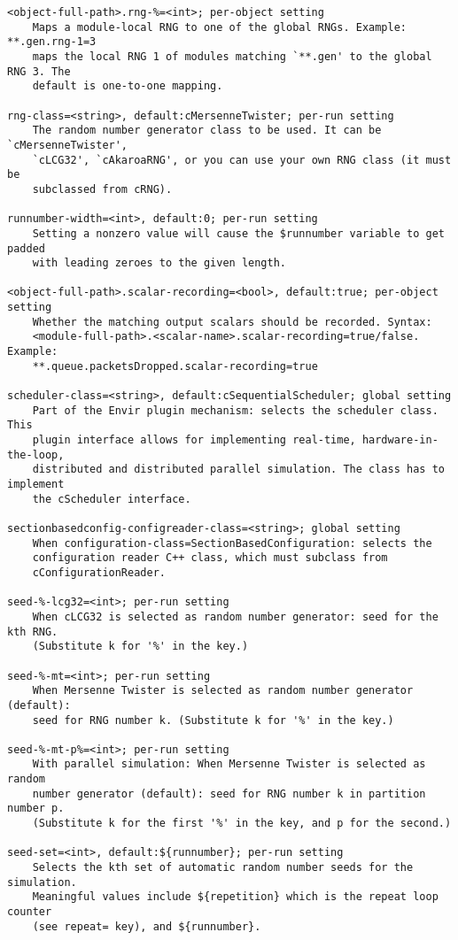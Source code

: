 \begin{verbatim}
<object-full-path>.rng-%=<int>; per-object setting
    Maps a module-local RNG to one of the global RNGs. Example: **.gen.rng-1=3
    maps the local RNG 1 of modules matching `**.gen' to the global RNG 3. The
    default is one-to-one mapping.

rng-class=<string>, default:cMersenneTwister; per-run setting
    The random number generator class to be used. It can be `cMersenneTwister',
    `cLCG32', `cAkaroaRNG', or you can use your own RNG class (it must be
    subclassed from cRNG).

runnumber-width=<int>, default:0; per-run setting
    Setting a nonzero value will cause the $runnumber variable to get padded
    with leading zeroes to the given length.

<object-full-path>.scalar-recording=<bool>, default:true; per-object setting
    Whether the matching output scalars should be recorded. Syntax:
    <module-full-path>.<scalar-name>.scalar-recording=true/false. Example:
    **.queue.packetsDropped.scalar-recording=true

scheduler-class=<string>, default:cSequentialScheduler; global setting
    Part of the Envir plugin mechanism: selects the scheduler class. This
    plugin interface allows for implementing real-time, hardware-in-the-loop,
    distributed and distributed parallel simulation. The class has to implement
    the cScheduler interface.

sectionbasedconfig-configreader-class=<string>; global setting
    When configuration-class=SectionBasedConfiguration: selects the
    configuration reader C++ class, which must subclass from
    cConfigurationReader.

seed-%-lcg32=<int>; per-run setting
    When cLCG32 is selected as random number generator: seed for the kth RNG.
    (Substitute k for '%' in the key.)

seed-%-mt=<int>; per-run setting
    When Mersenne Twister is selected as random number generator (default):
    seed for RNG number k. (Substitute k for '%' in the key.)

seed-%-mt-p%=<int>; per-run setting
    With parallel simulation: When Mersenne Twister is selected as random
    number generator (default): seed for RNG number k in partition number p.
    (Substitute k for the first '%' in the key, and p for the second.)

seed-set=<int>, default:${runnumber}; per-run setting
    Selects the kth set of automatic random number seeds for the simulation.
    Meaningful values include ${repetition} which is the repeat loop counter
    (see repeat= key), and ${runnumber}.


\end{verbatim}
